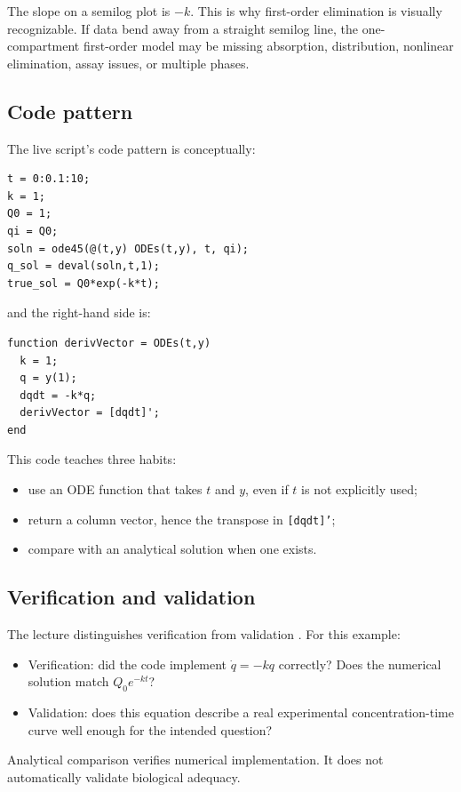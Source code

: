 \documentclass[a4paper]{article}
\newcommand{\code}[1]{\texttt{#1}}
\begin{document}
The slope on a semilog plot is \(-k\). This is why first-order elimination is visually recognizable. If data bend away from a straight semilog line, the one-compartment first-order model may be missing absorption, distribution, nonlinear elimination, assay issues, or multiple phases.

\subsection{Code pattern}

The live script's code pattern is conceptually:
\begin{verbatim}
t = 0:0.1:10;
k = 1;
Q0 = 1;
qi = Q0;
soln = ode45(@(t,y) ODEs(t,y), t, qi);
q_sol = deval(soln,t,1);
true_sol = Q0*exp(-k*t);
\end{verbatim}
and the right-hand side is:
\begin{verbatim}
function derivVector = ODEs(t,y)
  k = 1;
  q = y(1);
  dqdt = -k*q;
  derivVector = [dqdt]';
end
\end{verbatim}

This code teaches three habits:
\begin{itemize}[leftmargin=2em]
  \item use an ODE function that takes \(t\) and \(y\), even if \(t\) is not explicitly used;
  \item return a column vector, hence the transpose in \code{[dqdt]'};
  \item compare with an analytical solution when one exists.
\end{itemize}

\subsection{Verification and validation}

The lecture distinguishes verification from validation \cite{bmeg671TranscriptAug292025}. For this example:
\begin{itemize}[leftmargin=2em]
  \item Verification: did the code implement \(\dot q=-kq\) correctly? Does the numerical solution match \(Q_0e^{-kt}\)?
  \item Validation: does this equation describe a real experimental concentration-time curve well enough for the intended question?
\end{itemize}
Analytical comparison verifies numerical implementation. It does not automatically validate biological adequacy.
\end{document}
